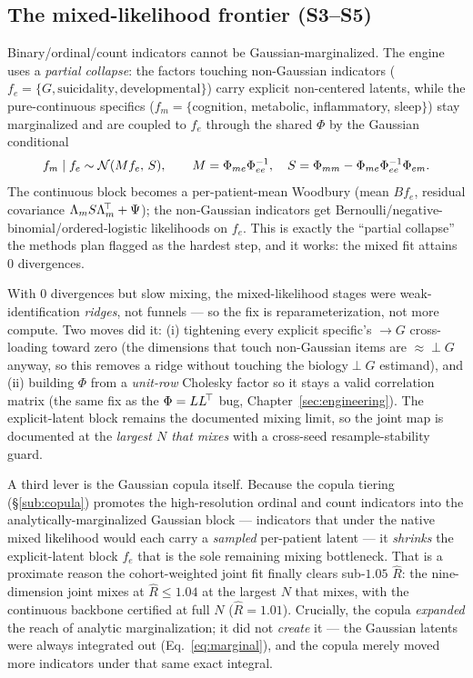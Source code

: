 \subsection{The mixed-likelihood frontier (S3--S5)}
Binary/ordinal/count indicators cannot be Gaussian-marginalized. The engine uses a \emph{partial collapse}: the
factors touching non-Gaussian indicators ($f_e=\{G,\text{suicidality},\text{developmental}\}$) carry explicit
non-centered latents, while the pure-continuous specifics ($f_m=\{$cognition, metabolic, inflammatory, sleep$\}$)
stay marginalized and are coupled to $f_e$ through the shared $\Phi$ by the Gaussian conditional
\begin{equation}
f_m\mid f_e\sim\mathcal{N}(M f_e,\,S),\qquad M=\Phi_{me}\Phi_{ee}^{-1},\quad S=\Phi_{mm}-\Phi_{me}\Phi_{ee}^{-1}\Phi_{em}.
\end{equation}
The continuous block becomes a per-patient-mean Woodbury (mean $B f_e$, residual covariance
$\Lambda_m S\Lambda_m^{\!\top}+\Psi$); the non-Gaussian indicators get Bernoulli/negative-binomial/ordered-logistic
likelihoods on $f_e$. This is exactly the ``partial collapse'' the methods plan flagged as the hardest step,
and it works: the mixed fit attains $0$ divergences.

\begin{methodsbox}
With $0$ divergences but slow mixing, the mixed-likelihood stages were weak-identification \emph{ridges}, not
funnels --- so the fix is reparameterization, not more compute. Two moves did it: (i) tightening every explicit
specific's $\to G$ cross-loading toward zero (the dimensions that touch non-Gaussian items are $\approx\perp G$
anyway, so this removes a ridge without touching the biology$\perp G$ estimand), and (ii) building $\Phi$ from
a \emph{unit-row} Cholesky factor so it stays a valid correlation matrix (the same fix as the $\Phi=LL^{\!\top}$ bug,
Chapter~\ref{sec:engineering}). The explicit-latent block remains the documented mixing limit, so the joint map
is documented at the \emph{largest $N$ that mixes} with a cross-seed resample-stability guard.
\end{methodsbox}

A third lever is the Gaussian copula itself. Because the copula tiering (\S\ref{sub:copula}) promotes the
high-resolution ordinal and count indicators into the analytically-marginalized Gaussian block --- indicators
that under the native mixed likelihood would each carry a \emph{sampled} per-patient latent --- it
\emph{shrinks} the explicit-latent block $f_e$ that is the sole remaining mixing bottleneck. That is a proximate
reason the cohort-weighted joint fit finally clears sub-$1.05$ $\widehat R$: the nine-dimension joint mixes at
$\widehat R\le1.04$ at the largest $N$ that mixes, with the continuous backbone certified at full $N$
($\widehat R=1.01$). Crucially, the copula \emph{expanded} the reach of analytic marginalization; it did not
\emph{create} it --- the Gaussian latents were always integrated out (Eq.~\ref{eq:marginal}), and the copula
merely moved more indicators under that same exact integral.

